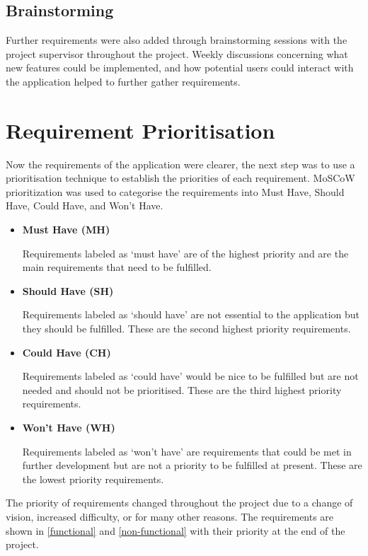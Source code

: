 \subsection{Brainstorming}
Further requirements were also added through brainstorming sessions with the project supervisor throughout the project. Weekly discussions concerning what new features could be implemented, and how potential users could interact with the application helped to further gather requirements.
\section{Requirement Prioritisation}\label{reqPrior}
Now the requirements of the application were clearer, the next step was to use a prioritisation technique to establish the priorities of each requirement. MoSCoW prioritization \cite{moscow} was used to categorise the requirements into Must Have, Should Have, Could Have, and Won't Have.
\begin{itemize}
    \item \textbf{Must Have (MH)} \par
    Requirements labeled as `must have' are of the highest priority and are the main requirements that need to be fulfilled. 
    \item \textbf{Should Have (SH)} \par
    Requirements labeled as `should have' are not essential to the application but they should be fulfilled. These are the second highest priority requirements. 
    \item \textbf{Could Have (CH)} \par
    Requirements labeled as `could have' would be nice to be fulfilled but are not needed and should not be prioritised. These are the third highest priority requirements. 
    \item \textbf{Won't Have (WH)} \par
    Requirements labeled as `won't have' are requirements that could be met in further development but are not a priority to be fulfilled at present. These are the lowest priority requirements. 
\end{itemize}
The priority of requirements changed throughout the project due to a change of vision, increased difficulty, or for many other reasons. The requirements are shown in \ref{functional} and \ref{non-functional} with their priority at the end of the project.
